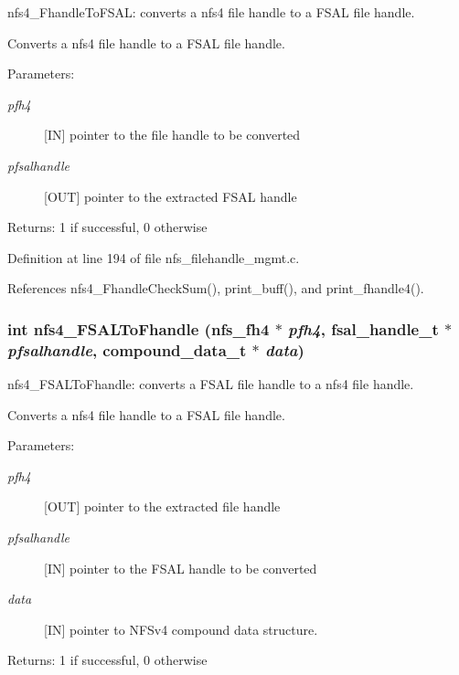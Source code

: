 nfs4\_\-Fhandle\-To\-FSAL: converts a nfs4 file handle to a FSAL file handle.

Converts a nfs4 file handle to a FSAL file handle.

\begin{Desc}
\item[Parameters:]
\begin{description}
\item[{\em pfh4}][IN] pointer to the file handle to be converted \item[{\em pfsalhandle}][OUT] pointer to the extracted FSAL handle\end{description}
\end{Desc}
\begin{Desc}
\item[Returns:]1 if successful, 0 otherwise \end{Desc}


Definition at line 194 of file nfs\_\-filehandle\_\-mgmt.c.

References nfs4\_\-Fhandle\-Check\-Sum(), print\_\-buff(), and print\_\-fhandle4().
\subsubsection{\setlength{\rightskip}{0pt plus 5cm}int nfs4\_\-FSALTo\-Fhandle (nfs\_\-fh4 $\ast$ {\em pfh4}, fsal\_\-handle\_\-t $\ast$ {\em pfsalhandle}, compound\_\-data\_\-t $\ast$ {\em data})}\label{nfs__filehandle__mgmt_8c_a5}


nfs4\_\-FSALTo\-Fhandle: converts a FSAL file handle to a nfs4 file handle.

Converts a nfs4 file handle to a FSAL file handle.

\begin{Desc}
\item[Parameters:]
\begin{description}
\item[{\em pfh4}][OUT] pointer to the extracted file handle \item[{\em pfsalhandle}][IN] pointer to the FSAL handle to be converted \item[{\em data}][IN] pointer to NFSv4 compound data structure.\end{description}
\end{Desc}
\begin{Desc}
\item[Returns:]1 if successful, 0 otherwise \end{Desc}


